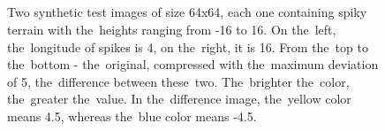 \begin{figure}
	\\\\
	\\\\
	\caption{Two synthetic test images of size 64x64, each one containing spiky terrain with the~heights ranging from -16 to 16. On the~left, the~longitude of spikes is 4, on the~right, it is 16. From the~top to the~bottom - the~original, compressed with the~maximum deviation of 5, the~difference between these~two. The~brighter the~color, the~greater the~value. In the~difference image, the~yellow color means 4.5, whereas the~blue color means -4.5.}
	\label{fig:result_wave_samples}
\end{figure}